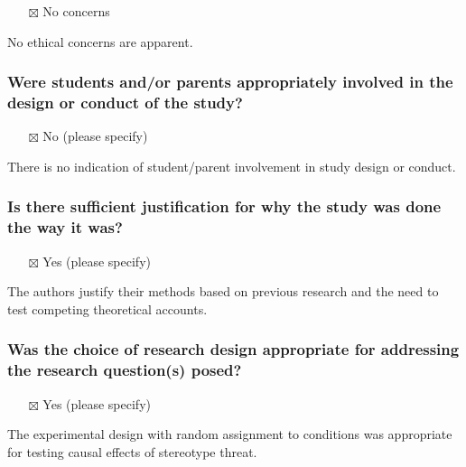 \documentclass[
  doc, a4paper]{apa7}
\providecommand{\tightlist}{%
  \setlength{\itemsep}{0pt}\setlength{\parskip}{0pt}}
\begin{document}
\begin{itemize}
\tightlist
\item[$\boxtimes$]
  No concerns
\end{itemize}

No ethical concerns are apparent.

\subsubsection{Were students and/or parents appropriately involved in the design or conduct of the study?}\label{were-students-andor-parents-appropriately-involved-in-the-design-or-conduct-of-the-study}

\begin{itemize}
\tightlist
\item[$\boxtimes$]
  No (please specify)
\end{itemize}

There is no indication of student/parent involvement in study design or conduct.

\subsubsection{Is there sufficient justification for why the study was done the way it was?}\label{is-there-sufficient-justification-for-why-the-study-was-done-the-way-it-was}

\begin{itemize}
\tightlist
\item[$\boxtimes$]
  Yes (please specify)
\end{itemize}

The authors justify their methods based on previous research and the need to test competing theoretical accounts.

\subsubsection{Was the choice of research design appropriate for addressing the research question(s) posed?}\label{was-the-choice-of-research-design-appropriate-for-addressing-the-research-questions-posed}

\begin{itemize}
\tightlist
\item[$\boxtimes$]
  Yes (please specify)
\end{itemize}

The experimental design with random assignment to conditions was appropriate for testing causal effects of stereotype threat.
\end{document}
